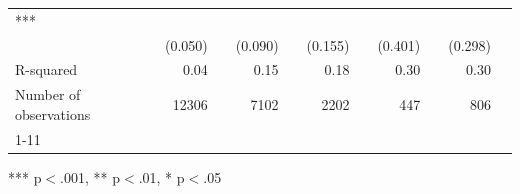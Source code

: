 \documentclass{article}
\begin{document}
\begin{table}[!h]
\begin{tabular}{lllllllllll}
  \multicolumn{1}{l}{***} \\
\multicolumn{1}{l}{} &
  \multicolumn{1}{r}{(0.050)} &
  \multicolumn{1}{l}{} &
  \multicolumn{1}{r}{(0.090)} &
  \multicolumn{1}{l}{} &
  \multicolumn{1}{r}{(0.155)} &
  \multicolumn{1}{l}{} &
  \multicolumn{1}{r}{(0.401)} &
  \multicolumn{1}{l}{} &
  \multicolumn{1}{r}{(0.298)} &
  \multicolumn{1}{l}{} \\
\multicolumn{1}{l}{R-squared} &
  \multicolumn{1}{r}{0.04} &
  \multicolumn{1}{l}{} &
  \multicolumn{1}{r}{0.15} &
  \multicolumn{1}{l}{} &
  \multicolumn{1}{r}{0.18} &
  \multicolumn{1}{l}{} &
  \multicolumn{1}{r}{0.30} &
  \multicolumn{1}{l}{} &
  \multicolumn{1}{r}{0.30} &
  \multicolumn{1}{l}{} \\
\multicolumn{1}{l}{Number of observations} &
  \multicolumn{1}{r}{12306} &
  \multicolumn{1}{l}{} &
  \multicolumn{1}{r}{7102} &
  \multicolumn{1}{l}{} &
  \multicolumn{1}{r}{2202} &
  \multicolumn{1}{l}{} &
  \multicolumn{1}{r}{447} &
  \multicolumn{1}{l}{} &
  \multicolumn{1}{r}{806} &
  \multicolumn{1}{l}{} \\
\cline{1-11}
\end{tabular}

\footnotesize{
*** p$<$.001, ** p$<$.01, * p$<$.05
}
\end{table}
\end{document}
